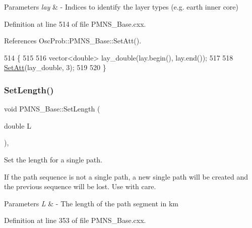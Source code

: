 \begin{DoxyParams}{Parameters}
{\em lay} & -\/ Indices to identify the layer types (e.\+g. earth inner core) \\
\hline
\end{DoxyParams}


Definition at line 514 of file P\+M\+N\+S\+\_\+\+Base.\+cxx.



References Osc\+Prob\+::\+P\+M\+N\+S\+\_\+\+Base\+::\+Set\+Att().


\begin{DoxyCode}
514                                            \{
515 
516   vector<double> lay\_double(lay.begin(), lay.end());
517 
518   \hyperlink{classOscProb_1_1PMNS__Base_aba565962a440d14bee7a2a96d2eca2c5}{SetAtt}(lay\_double, 3);
519 
520 \}
\end{DoxyCode}
\mbox{\label{classOscProb_1_1PMNS__Base_a6241325b1bd28cafa556daaecbe4ed62}} 
\subsubsection{\texorpdfstring{Set\+Length()}{SetLength()}\hspace{0.1cm}{\footnotesize\ttfamily [1/2]}}
{\footnotesize\ttfamily void P\+M\+N\+S\+\_\+\+Base\+::\+Set\+Length (\begin{DoxyParamCaption}\item[{double}]{L }\end{DoxyParamCaption})\hspace{0.3cm}{\ttfamily [virtual]}, {\ttfamily [inherited]}}

Set the length for a single path.

If the path sequence is not a single path, a new single path will be created and the previous sequence will be lost. Use with care.


\begin{DoxyParams}{Parameters}
{\em L} & -\/ The length of the path segment in km \\
\hline
\end{DoxyParams}


Definition at line 353 of file P\+M\+N\+S\+\_\+\+Base.\+cxx.




